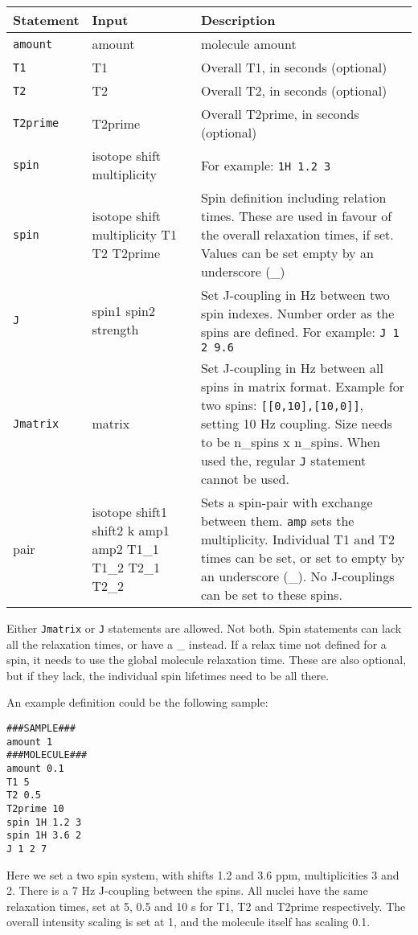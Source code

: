 \documentclass[11pt,a4paper]{article}
\begin{document}
\begin{center}
\begin{tabular}{lp{5cm}p{6cm}}
\toprule
\textbf{Statement} & \textbf{Input} & \textbf{Description} \\
\midrule
\rowcolor{gray!30!white}
\texttt{amount} & amount & molecule amount\\
\texttt{T1} & T1 & Overall T1, in seconds (optional)\\
\rowcolor{gray!30!white}
\texttt{T2} & T2 & Overall T2, in seconds (optional)\\
\texttt{T2prime} & T2prime & Overall T2prime, in seconds (optional)\\
\rowcolor{gray!30!white}
\texttt{spin} & isotope shift multiplicity & For example: \texttt{1H 1.2 3}\\
\texttt{spin} & isotope shift multiplicity T1 T2 T2prime & Spin definition including relation times. These are used in favour of the overall relaxation times, if set. Values can be set empty by an underscore (\_) \\
\rowcolor{gray!30!white}
\texttt{J} & spin1 spin2 strength & Set J-coupling in Hz between two spin indexes. Number order as the spins are defined. For example: \texttt{J 1 2 9.6}\\
\texttt{Jmatrix} & matrix & Set J-coupling in Hz between all spins in matrix format. Example for two spins: \texttt{[[0,10],[10,0]]}, setting 10 Hz coupling. Size needs to be n\_spins x n\_spins. When used the, regular \texttt{J} statement cannot be used.\\
\rowcolor{gray!30!white}
pair & isotope shift1 shift2 k amp1 amp2 T1\_1 T1\_2 T2\_1 T2\_2 &  Sets a spin-pair with exchange between them. \texttt{amp} sets the multiplicity. Individual T1 and T2 times can be set, or set to empty by an underscore (\_). No J-couplings can be set to these spins.\\
\bottomrule
\end{tabular}
\end{center}

Either \texttt{Jmatrix} or \texttt{J} statements are allowed. Not both.
Spin statements can lack all the relaxation times, or have a \_ instead.
If a relax time not defined for a spin, it needs to use the global molecule relaxation time.
These are also optional, but if they lack, the individual spin lifetimes need to be all there.

An example definition could be the following sample:
\begin{verbatim}
###SAMPLE###
amount 1
###MOLECULE###
amount 0.1
T1 5
T2 0.5
T2prime 10
spin 1H 1.2 3
spin 1H 3.6 2
J 1 2 7
\end{verbatim}
Here we set a two spin system, with shifts 1.2 and 3.6 ppm, multiplicities 3 and 2. There is a 7 Hz J-coupling between the spins. All nuclei have the same relaxation times, set at 5, 0.5 and 10 s for T1, T2 and T2prime respectively. The overall intensity scaling is set at 1, and the molecule itself has scaling 0.1.
\end{document}
